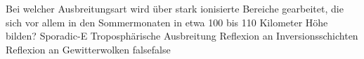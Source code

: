     {Bei welcher Ausbreitungsart wird über stark ionisierte Bereiche gearbeitet, die sich vor allem in den Sommermonaten in etwa 100 bis 110 Kilometer Höhe bilden?}
    {Sporadic-E}
    {Troposphärische Ausbreitung}
    {Reflexion an Inversionsschichten}
    {Reflexion an Gewitterwolken}
    {false}{false}